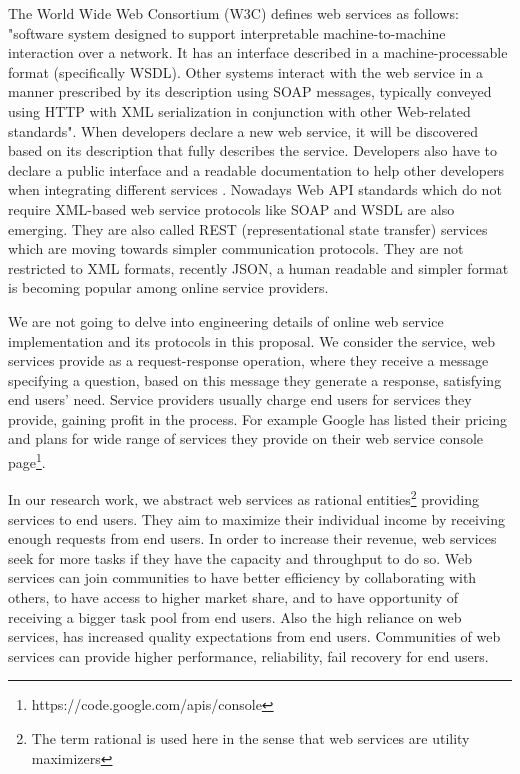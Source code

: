         The World Wide Web Consortium (W3C) defines web services as follows: "software
        system designed to support interpretable machine-to-machine interaction over a network.
        It has an interface described in a machine-processable format (specifically WSDL). Other
        systems interact with the web service in a manner prescribed by its description using
        SOAP messages, typically conveyed using HTTP with XML serialization in conjunction
        with other Web-related standards". When developers declare a new web service, it will
        be discovered based on its description that fully describes the service. Developers also
        have to declare a public interface and a readable documentation to help other developers
        when integrating different services \cite{w3cwsdl}. Nowadays Web API standards which do not 
        require XML-based web service protocols like SOAP and WSDL are also emerging. They are also called 
        REST (representational state transfer) services which are moving towards simpler communication protocols.
        They are not restricted to XML formats, recently JSON, a human readable and simpler format is becoming popular among online service providers.        
        
        We are not going to delve into engineering details of online web service implementation and its protocols in this proposal. 
        We consider the service, web services provide as a request-response operation, where they receive a message specifying a question, 
        based on this message they generate a response, satisfying end users' need. Service providers usually charge end users for services they provide,
        gaining profit in the process. For example Google has listed their pricing and plans for wide range of services they provide
        on their web service console page\footnote{https://code.google.com/apis/console}.
        
        In our research work, we abstract web services as rational entities\footnote{The term 
        rational is used here in the sense that web services are utility
        maximizers} providing services to end users. They aim to maximize
        their individual income by receiving enough requests from end
        users. In order to increase their revenue, web services seek for
        more tasks if they have the capacity and throughput to do so. Web
        services can join communities to have better efficiency by
        collaborating with others, to have access to higher market share,
        and to have opportunity of receiving a bigger task pool from end
        users. Also the high reliance on web services, has increased quality expectations from end users.
        Communities of web services can provide higher performance, reliability, fail recovery for end users. 
        
